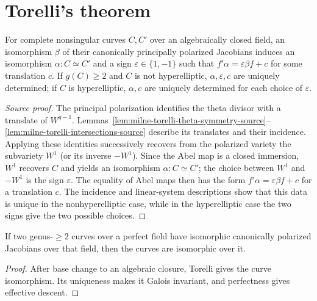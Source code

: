 \section{Torelli's theorem}
\begin{theorem}[Torelli]
\label{thm:milne-torelli-source}

For complete nonsingular curves $C,C'$ over an algebraically closed field,
an isomorphism $\beta$ of their canonically principally polarized Jacobians
induces an isomorphism $\alpha:C\simeq C'$ and a sign
$\varepsilon\in\{1,-1\}$ such that
$f'\alpha=\varepsilon\beta f+c$ for some translation $c$.  If $g(C)\ge2$
and $C$ is not hyperelliptic, $\alpha,\varepsilon,c$ are uniquely determined;
if $C$ is hyperelliptic, $\alpha,c$ are uniquely determined for each choice of
$\varepsilon$.
\end{theorem}

\begin{proof}[Source proof]
The principal polarization identifies the theta divisor with a translate of
$W^{g-1}$.  Lemmas~\ref{lem:milne-torelli-theta-symmetry-source}--
\ref{lem:milne-torelli-intersections-source} describe its translates and their
incidence.  Applying these identities successively recovers from the
polarized variety the subvariety $W^1$ (or its inverse $-W^1$).  Since the Abel
map is a closed immersion, $W^1$ recovers $C$ and yields an isomorphism
$\alpha:C\simeq C'$; the choice between $W^1$ and $-W^1$ is the sign
$\varepsilon$.  The equality of Abel maps then has the form
$f'\alpha=\varepsilon\beta f+c$ for a translation $c$.  The incidence and
linear-system descriptions show that this data is unique in the nonhyperelliptic
case, while in the hyperelliptic case the two signs give the two possible
choices.
\end{proof}


\begin{corollary}
\label{cor:milne-torelli-perfect-source}

If two genus-$\ge2$ curves over a perfect field have isomorphic canonically
polarized Jacobians over that field, then the curves are isomorphic over it.
\end{corollary}
\begin{proof}
After base change to an algebraic closure, Torelli gives the curve
isomorphism.  Its uniqueness makes it Galois invariant, and perfectness gives
effective descent.
\end{proof}

